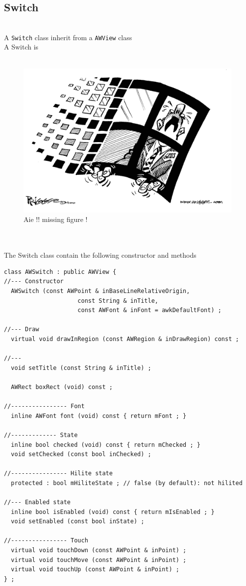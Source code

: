 \documentclass[a4paper,11pt]{extarticle}
\begin{document}
\newpage
\subsection{Switch}

~\\ A \texttt{Switch} class inherit from a \texttt{AWView} class
~\\ A Switch is 
~\\
~\\

\begin{figure}[htbp]
   \centering
   \includegraphics[scale=0.55]{AWFig.png} 
   \caption{Aie !! missing figure !}
   \label{fig:15 }
\end{figure}

~\\

~\\ The Switch class contain the following constructor and methods

\begin{lstlisting}[language=Arduinonl]
class AWSwitch : public AWView {
//--- Constructor
  AWSwitch (const AWPoint & inBaseLineRelativeOrigin,
                     const String & inTitle,
                     const AWFont & inFont = awkDefaultFont) ;

//--- Draw
  virtual void drawInRegion (const AWRegion & inDrawRegion) const ;

//---
  void setTitle (const String & inTitle) ;

  AWRect boxRect (void) const ;

//---------------- Font
  inline AWFont font (void) const { return mFont ; }

//------------- State
  inline bool checked (void) const { return mChecked ; }
  void setChecked (const bool inChecked) ;

//---------------- Hilite state
  protected : bool mHiliteState ; // false (by default): not hilited

//--- Enabled state
  inline bool isEnabled (void) const { return mIsEnabled ; }
  void setEnabled (const bool inState) ;

//---------------- Touch
  virtual void touchDown (const AWPoint & inPoint) ;
  virtual void touchMove (const AWPoint & inPoint) ;
  virtual void touchUp (const AWPoint & inPoint) ;
} ;
\end{lstlisting}
\end{document}
